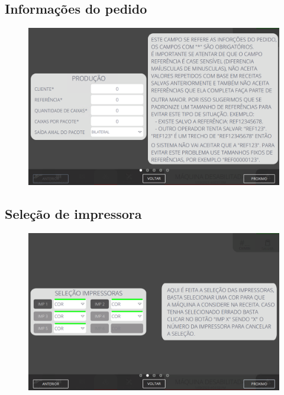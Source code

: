\thispagestyle{fancy}
\vspace*{40 pt}
\subsection{\small Informações do pedido}
\vspace*{\fill}
\begin{figure}[h]
    \centering
    \includegraphics[width=480 px,height=300 px]{src/imagesICV/09-request/new/e-1-COM-ERRO-DIGITAÇÃO.png}
\end{figure}
\vspace*{\fill}

\newpage
\thispagestyle{fancy}
\vspace*{40 pt}
\subsection{\small Seleção de impressora}
\vspace*{\fill}
\begin{figure}[h]
    \centering
    \includegraphics[width=576 px,height=360 px]{src/imagesICV/09-request/new/e-2.png}
\end{figure}
\vspace*{\fill}

